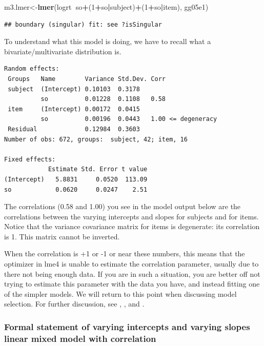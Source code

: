\documentclass[12pt,]{krantz}
\newenvironment{Shaded}{\begin{snugshade}}{\end{snugshade}}
\newcommand{\DecValTok}[1]{\textcolor[rgb]{0.00,0.00,0.81}{#1}}
\newcommand{\KeywordTok}[1]{\textcolor[rgb]{0.13,0.29,0.53}{\textbf{#1}}}
\newcommand{\NormalTok}[1]{#1}
\newcommand{\OperatorTok}[1]{\textcolor[rgb]{0.81,0.36,0.00}{\textbf{#1}}}
\begin{document}
\begin{Shaded}
\begin{Highlighting}[]
\NormalTok{m3.lmer<-}\KeywordTok{lmer}\NormalTok{(logrt}\OperatorTok{~}\NormalTok{so}\OperatorTok{+}\NormalTok{(}\DecValTok{1}\OperatorTok{+}\NormalTok{so}\OperatorTok{|}\NormalTok{subject)}\OperatorTok{+}\NormalTok{(}\DecValTok{1}\OperatorTok{+}\NormalTok{so}\OperatorTok{|}\NormalTok{item),}
\NormalTok{              gg05e1)}
\end{Highlighting}
\end{Shaded}

\begin{verbatim}
## boundary (singular) fit: see ?isSingular
\end{verbatim}

To understand what this model is doing, we have to recall what a bivariate/multivariate distribution is.

\begin{verbatim}
Random effects:
 Groups   Name        Variance Std.Dev. Corr
 subject  (Intercept) 0.10103  0.3178       
          so          0.01228  0.1108   0.58
 item     (Intercept) 0.00172  0.0415       
          so          0.00196  0.0443   1.00 <= degeneracy
 Residual             0.12984  0.3603       
Number of obs: 672, groups:  subject, 42; item, 16

Fixed effects:
            Estimate Std. Error t value
(Intercept)   5.8831     0.0520  113.09
so            0.0620     0.0247    2.51
\end{verbatim}

The correlations (0.58 and 1.00) you see in the model output below are the correlations between the varying intercepts and slopes for subjects and for items. Notice that the variance covariance matrix for items is degenerate: its correlation is 1. This matrix cannot be inverted.

When the correlation is +1 or -1 or near these numbers, this means that the optimizer in lme4 is unable to estimate the correlation parameter, usually due to there not being enough data. If you are in such a situation, you are better off not trying to estimate this parameter with the data you have, and instead fitting one of the simpler models. We will return to this point when discussing model selection. For further discussion, see \citet{barr2013}, \citet{BatesEtAlParsimonious}, and \citet{hannesBEAP}.

\hypertarget{formal-statement-of-varying-intercepts-and-varying-slopes-linear-mixed-model-with-correlation}{%
\subsubsection{Formal statement of varying intercepts and varying slopes linear mixed model with correlation}\label{formal-statement-of-varying-intercepts-and-varying-slopes-linear-mixed-model-with-correlation}}
\end{document}
